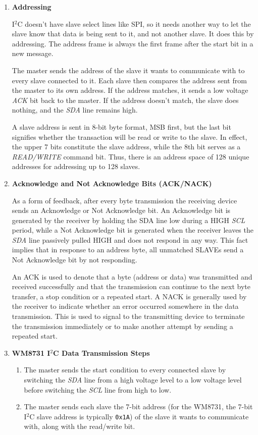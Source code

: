 \begin{enumerate}[label=\alph*) ]
	\item \textbf{Addressing}
	
	I$^{2}$C doesn’t have slave select lines like SPI, so it needs another way to let the slave know that data is being sent to it, and not another slave. It does this by addressing. The address frame is always the first frame after the start bit in a new message.  
	
	The master sends the address of the slave it wants to communicate with to every slave connected to it. Each slave then compares the address sent from the master to its own address. If the address matches, it sends a low voltage \textit{ACK} bit back to the master. If the address doesn’t match, the slave does nothing, and the \textit{SDA} line remains high.  
	
	A slave address is sent in 8-bit byte format, MSB first, but the last bit signifies whether the transaction will be read or write to the slave. In effect, the upper 7 bits constitute the slave address, while the 8th bit serves as a \textit{READ/WRITE} command bit. Thus, there is an address space of 128 unique addresses for addressing up to 128 slaves.
	
	\item \textbf{Acknowledge and Not Acknowledge Bits (ACK/NACK)}
	
	As a form of feedback, after every byte transmission the receiving device sends an Acknowledge or Not Acknowledge bit. An Acknowledge bit is generated by the receiver by holding the SDA line low during a HIGH \textit{SCL} period, while a Not Acknowledge bit is generated when the receiver leaves the \textit{SDA} line passively pulled HIGH and does not respond in any way. This fact implies that in response to an address byte, all unmatched SLAVEs send a Not Acknowledge bit by not responding.
	
	An ACK is used to denote that a byte (address or data) was transmitted and received successfully and that the transmission can continue to the next byte transfer, a stop condition or a repeated start. A NACK is generally used by the receiver to indicate whether an error occurred somewhere in the data transmission. This is used to signal to the transmitting device to terminate the transmission immediately or to make another attempt by sending a repeated start.
	
	\item \textbf{WM8731 I$^{2}$C Data Transmission Steps}
	
		\begin{enumerate}[label=Step \arabic*., leftmargin=2cm]
			\item The master sends the start condition to every connected slave by switching the \textit{SDA} line from a high voltage level to a low voltage level before switching the \textit{SCL} line from high to low.
			\item The master sends each slave the 7-bit address (for the WM8731, the 7-bit I$^{2}$C slave address is typically \texttt{0x1A}) of the slave it wants to communicate with, along with the read/write bit.
			

\end{enumerate}
\end{enumerate}
